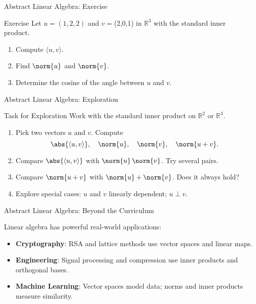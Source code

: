 \cyanheader
\begin{frame}{Abstract Linear Algebra: Exercise}
\begin{cyan*}{Exercise}
Let $u=(1,2,2)$ and $v=$(2,0,1) in $\mathbb{R}^3$ with the standard inner product.
\begin{enumerate}
    \item Compute $\langle u,v \rangle$.
    \item Find $\norm{u}$ and $\norm{v}$.
    \item Determine the cosine of the angle between $u$ and $v$.
\end{enumerate}
\end{cyan*}
\end{frame}

\magentaheader
\begin{frame}{Abstract Linear Algebra: Exploration}
\begin{magenta*}{Task for Exploration}
Work with the standard inner product on $\mathbb{R}^2$ or $\mathbb{R}^3$.
\begin{enumerate}
    \item Pick two vectors $u$ and $v$. Compute
    \[
    \abs{\langle u,v\rangle}, \quad \norm{u}, \quad \norm{v}, \quad \norm{u+v}.
    \]
    \item Compare $\abs{\langle u,v\rangle}$ with $\norm{u}\,\norm{v}$. Try several pairs.
    \item Compare $\norm{u+v}$ with $\norm{u}+\norm{v}$. Does it always hold?
    \item Explore special cases: $u$ and $v$ linearly dependent; $u \perp v$.
\end{enumerate}
\end{magenta*}

\medskip
{}
\end{frame}


\blueheader
\begin{frame}{Abstract Linear Algebra: Beyond the Curriculum}

\warn

\medskip
Linear algebra has powerful real-world applications:
\begin{itemize}
    \item \textbf{Cryptography}: RSA and lattice methods use vector spaces and linear maps.
    \item \textbf{Engineering}: Signal processing and compression use inner products and orthogonal bases.
    \item \textbf{Machine Learning}: Vector spaces model data; norms and inner products measure similarity.
\end{itemize}

\end{frame}
